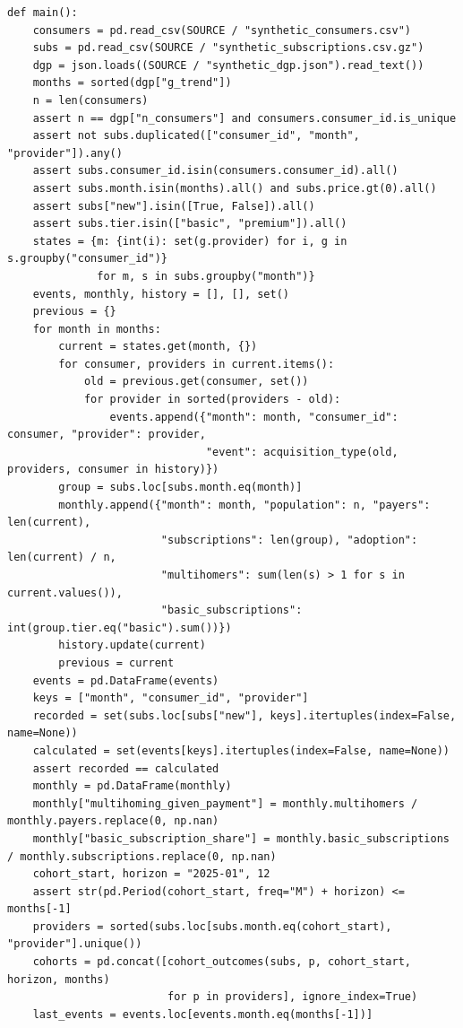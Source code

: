 \begin{Verbatim}[breaklines,breakanywhere,fontsize=\small]
def main():
    consumers = pd.read_csv(SOURCE / "synthetic_consumers.csv")
    subs = pd.read_csv(SOURCE / "synthetic_subscriptions.csv.gz")
    dgp = json.loads((SOURCE / "synthetic_dgp.json").read_text())
    months = sorted(dgp["g_trend"])
    n = len(consumers)
    assert n == dgp["n_consumers"] and consumers.consumer_id.is_unique
    assert not subs.duplicated(["consumer_id", "month", "provider"]).any()
    assert subs.consumer_id.isin(consumers.consumer_id).all()
    assert subs.month.isin(months).all() and subs.price.gt(0).all()
    assert subs["new"].isin([True, False]).all()
    assert subs.tier.isin(["basic", "premium"]).all()
    states = {m: {int(i): set(g.provider) for i, g in s.groupby("consumer_id")}
              for m, s in subs.groupby("month")}
    events, monthly, history = [], [], set()
    previous = {}
    for month in months:
        current = states.get(month, {})
        for consumer, providers in current.items():
            old = previous.get(consumer, set())
            for provider in sorted(providers - old):
                events.append({"month": month, "consumer_id": consumer, "provider": provider,
                               "event": acquisition_type(old, providers, consumer in history)})
        group = subs.loc[subs.month.eq(month)]
        monthly.append({"month": month, "population": n, "payers": len(current),
                        "subscriptions": len(group), "adoption": len(current) / n,
                        "multihomers": sum(len(s) > 1 for s in current.values()),
                        "basic_subscriptions": int(group.tier.eq("basic").sum())})
        history.update(current)
        previous = current
    events = pd.DataFrame(events)
    keys = ["month", "consumer_id", "provider"]
    recorded = set(subs.loc[subs["new"], keys].itertuples(index=False, name=None))
    calculated = set(events[keys].itertuples(index=False, name=None))
    assert recorded == calculated
    monthly = pd.DataFrame(monthly)
    monthly["multihoming_given_payment"] = monthly.multihomers / monthly.payers.replace(0, np.nan)
    monthly["basic_subscription_share"] = monthly.basic_subscriptions / monthly.subscriptions.replace(0, np.nan)
    cohort_start, horizon = "2025-01", 12
    assert str(pd.Period(cohort_start, freq="M") + horizon) <= months[-1]
    providers = sorted(subs.loc[subs.month.eq(cohort_start), "provider"].unique())
    cohorts = pd.concat([cohort_outcomes(subs, p, cohort_start, horizon, months)
                         for p in providers], ignore_index=True)
    last_events = events.loc[events.month.eq(months[-1])]

\end{Verbatim}
